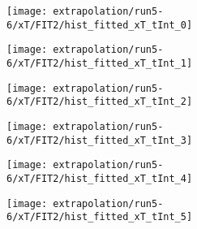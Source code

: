 \begin{figure}
\centering
\caption{Fit to the flask subtracted yield ratio with FIT2 for $x_T$ for run 5-6.}
\label{fig:run5-6_FIT2_xT}
\begin{subfigure}{0.45\linewidth}
\texttt{[image: extrapolation/run5-6/xT/FIT2/hist\_fitted\_xT\_tInt\_0]}
\end{subfigure}
\begin{subfigure}{0.45\linewidth}
\texttt{[image: extrapolation/run5-6/xT/FIT2/hist\_fitted\_xT\_tInt\_1]}
\end{subfigure}
\begin{subfigure}{0.45\linewidth}
\texttt{[image: extrapolation/run5-6/xT/FIT2/hist\_fitted\_xT\_tInt\_2]}
\end{subfigure}
\begin{subfigure}{0.45\linewidth}
\texttt{[image: extrapolation/run5-6/xT/FIT2/hist\_fitted\_xT\_tInt\_3]}
\end{subfigure}
\begin{subfigure}{0.45\linewidth}
\texttt{[image: extrapolation/run5-6/xT/FIT2/hist\_fitted\_xT\_tInt\_4]}
\end{subfigure}
\begin{subfigure}{0.45\linewidth}
\texttt{[image: extrapolation/run5-6/xT/FIT2/hist\_fitted\_xT\_tInt\_5]}
\end{subfigure}
\end{figure}

